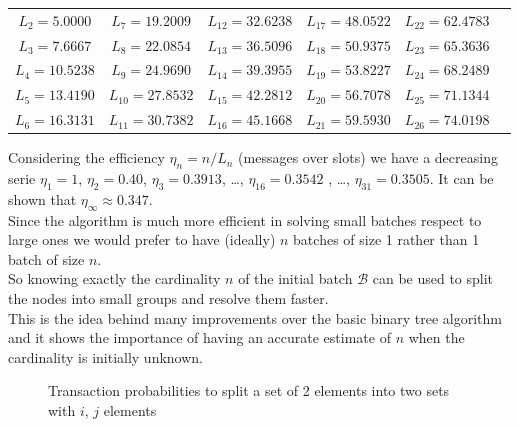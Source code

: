 \documentclass[12pt,a4paper]{report}
\begin{document}
\begin{center}
\begin{tabular}{cccccc}
$L_{2} = 5.0000 $&$L_{7} = 19.2009 $  &$L_{12} = 32.6238 $  &$L_{17} = 48.0522 $  &$L_{22} = 62.4783 $ \\ 
$L_{3} = 7.6667 $&$L_{8} = 22.0854 $  &$L_{13} = 36.5096 $  &$L_{18} = 50.9375 $  &$L_{23} = 65.3636 $ \\ 
$L_{4} = 10.5238 $&$L_{9} = 24.9690 $  &$L_{14} = 39.3955 $  &$L_{19} = 53.8227 $  &$L_{24} = 68.2489 $ \\ 
$L_{5} = 13.4190 $&$L_{10} = 27.8532 $  &$L_{15} = 42.2812 $  &$L_{20} = 56.7078 $  &$L_{25} = 71.1344 $ \\  
$L_{6} = 16.3131 $&$L_{11} = 30.7382 $  &$L_{16} = 45.1668 $  &$L_{21} = 59.5930 $  &$L_{26} = 74.0198 $ \\  
\end{tabular} 
\end{center}


Considering the efficiency $\eta_{n}=n/L_{n}$ (messages over slots) we have a decreasing serie $\eta_{1}=1$, $\eta_{2}=0.40$, $\eta_{3}=0.3913$, \dots, $\eta_{16}=0.3542$ , \dots, $\eta_{31}=0.3505$. It can be shown \cite{capetanakis} that $\eta_{\infty} \approx 0.347$.\\

Since the algorithm is much more efficient in solving small batches respect to large ones we would prefer to have (ideally)  $n$ batches of size 1 rather than 1 batch of size $n$.\\
So knowing exactly the cardinality $n$ of the initial batch $\mathcal{B}$ can be used to split the nodes into small groups and resolve them faster. \\This is the idea behind many improvements over the basic binary tree algorithm and it shows the importance of having an accurate estimate of $n$ when the cardinality is initially unknown.

\begin{figure}
\centering
{}
\caption[\emph{BT}: Batch split probabilities]{Transaction probabilities to split a set of 2 elements into two sets with $i$, $j$ elements}
\end{figure}
\end{document}

